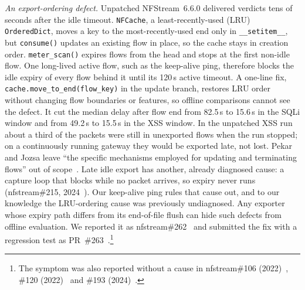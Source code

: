 \emph{An export-ordering defect.} Unpatched NFStream~6.6.0 delivered verdicts tens of seconds after the idle timeout. \texttt{NFCache}, a least-recently-used (LRU) \texttt{OrderedDict}, moves a key to the most-recently-used end only in \texttt{\_\_setitem\_\_}, but \texttt{consume()} updates an existing flow in place, so the cache stays in creation order. \texttt{meter\_scan()} expires flows from the head and stops at the first non-idle flow. One long-lived active flow, such as the keep-alive ping, therefore blocks the idle expiry of every flow behind it until its 120\,s active timeout. A one-line fix, \texttt{cache.move\_to\_end(flow\_key)} in the update branch, restores LRU order without changing flow boundaries or features, so offline comparisons cannot see the defect. It cut the median delay after flow end from 82.5\,s to 15.6\,s in the SQLi window and from 49.2\,s to 15.5\,s in the XSS window. In the unpatched XSS run about a third of the packets were still in unexported flows when the run stopped; on a continuously running gateway they would be exported late, not lost. Pekar and Jozsa leave ``the specific mechanisms employed for updating and terminating flows'' out of scope~\cite{pekar2024integrity}. Late idle export has another, already diagnosed cause: a capture loop that blocks while no packet arrives, so expiry never runs (nfstream\#215, 2024~\cite{nfstream215}). Our keep-alive ping rules that cause out, and to our knowledge the LRU-ordering cause was previously undiagnosed. Any exporter whose expiry path differs from its end-of-file flush can hide such defects from offline evaluation. We reported it as nfstream\#262~\cite{nfstream262} and submitted the fix with a regression test as PR~\#263~\cite{nfstream263}.\footnote{The symptom was also reported without a cause in nfstream\#106 (2022)~\cite{nfstream106}, \#120 (2022)~\cite{nfstream120} and \#193 (2024)~\cite{nfstream193}.}
